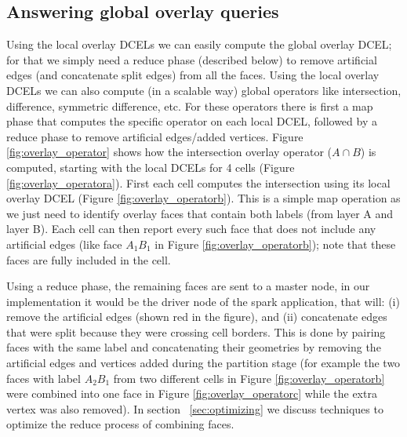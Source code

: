 %

\subsection{Answering global overlay queries} \label{sec:reduce}

Using the local overlay DCELs we can easily compute the global overlay DCEL; for that we simply need a reduce phase (described below) to remove artificial edges (and concatenate split edges) from all the faces. Using the local overlay DCELs we can also compute (in a scalable way) global operators like intersection, difference, symmetric difference, etc. For these operators there is first a map phase that computes the specific operator on each local DCEL, followed by a reduce phase to remove artificial edges/added vertices.
Figure \ref{fig:overlay_operator} shows how the intersection overlay operator ($A \cap B$) is computed, starting with the local DCELs for 4 cells (Figure \ref{fig:overlay_operatora}).
First each cell computes the intersection using its local overlay DCEL (Figure \ref{fig:overlay_operatorb}).
This is a simple map operation as we just need to identify overlay faces that contain both labels (from layer A and layer B).
Each cell can then report every such face that does not include any artificial edges (like face $A_1B_1$ in Figure \ref{fig:overlay_operatorb}); note that these faces are fully included in the cell. 

Using a reduce phase, the remaining faces are sent to a master node, in our implementation it would be the driver node of the spark application, that will: (i) remove the artificial edges (shown red in the figure), and (ii) concatenate edges that were split because they were crossing cell borders.
This is done by pairing faces with the same label and concatenating their geometries by removing the artificial edges and vertices added during the partition stage (for example the two faces with label $A_2B_1$ from two different cells in Figure \ref{fig:overlay_operatorb} were combined into one face in Figure \ref{fig:overlay_operatorc} while the extra vertex was also removed).
In section ~\ref{sec:optimizing} we discuss techniques to optimize the reduce process of combining faces.  

